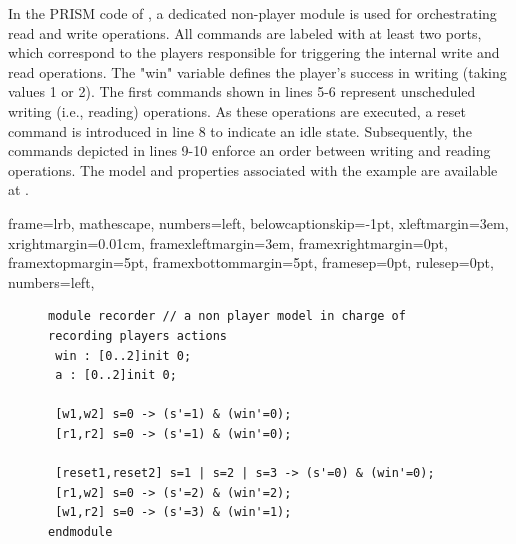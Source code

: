 \begin{example}
In the PRISM code of , a dedicated non-player module  is used for orchestrating read and write operations. All commands are labeled with at least two ports, which correspond to the players responsible for triggering the internal write and read operations. The "win" variable defines the player's success in writing (taking values 1 or 2).
The first commands shown in lines 5-6 represent unscheduled writing (i.e., reading) operations. As these operations are executed, a reset command is introduced in line 8 to indicate an idle state. Subsequently, the commands depicted in lines 9-10 enforce an order between writing and reading operations.  The model and properties associated with the example are available at \cite{edcc23}.

{
	frame=lrb,         
	mathescape,
	numbers=left,
	belowcaptionskip=-1pt,
    xleftmargin=3em,
		xrightmargin=0.01cm,
    framexleftmargin=3em,
	framexrightmargin=0pt,
	framextopmargin=5pt,
	framexbottommargin=5pt,
	framesep=0pt,
	rulesep=0pt,
	numbers=left,
}
    



\begin{figure}[!htb]            
\begin{minipage}{15.5cm}
\begin{lstlisting}[style=framed,%customc,
	caption=PRISM Code for Read/Write of \fig{fig:even:odds},
 	label=exampleinprism]	
module recorder // a non player model in charge of recording players actions
 win : [0..2]init 0;
 a : [0..2]init 0;
	
 [w1,w2] s=0 -> (s'=1) & (win'=0);
 [r1,r2] s=0 -> (s'=1) & (win'=0);

 [reset1,reset2] s=1 | s=2 | s=3 -> (s'=0) & (win'=0);
 [r1,w2] s=0 -> (s'=2) & (win'=2);
 [w1,r2] s=0 -> (s'=3) & (win'=1);
endmodule
\end{lstlisting}
 \end{minipage}  
\end{figure}

\end{example}

